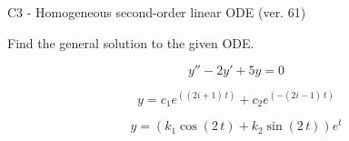 \begin{exercise}
  \begin{exerciseTitle}C3 - Homogeneous second-order linear ODE (ver. 61)\end{exerciseTitle}
  \begin{exerciseStatement}
    
Find the general solution to the given ODE.

    
\[y''-2y'+5y = 0\]

  \end{exerciseStatement}
  \begin{exerciseAnswer}
    
\[y= c_{1} e^{\left(\left(2 i + 1\right) \, t\right)} + c_{2} e^{\left(-\left(2 i - 1\right) \, t\right)}\]

    
\[y= {\left(k_{1} \cos\left(2 \, t\right) + k_{2} \sin\left(2 \, t\right)\right)} e^{t}\]

  \end{exerciseAnswer}
\end{exercise}